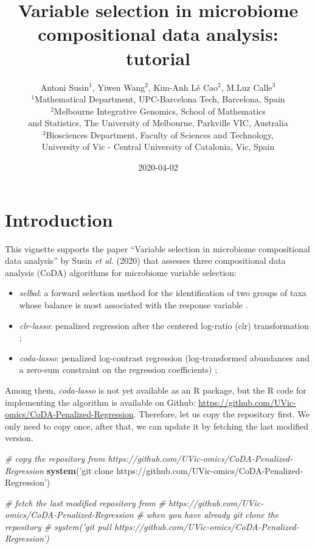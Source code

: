 \documentclass[openany]{book}
\title{Variable selection in microbiome compositional data analysis: tutorial}
\author{Antoni Susin\(^1\), Yiwen Wang\(^2\), Kim-Anh Lê Cao\(^2\), M.Luz
Calle\(^3\)\\[2\baselineskip]\(^1\)Mathematical Department,
UPC-Barcelona Tech, Barcelona, Spain\\
\(^2\)Melbourne Integrative Genomics, School of Mathematics\\
and Statistics, The University of Melbourne, Parkville VIC, Australia\\
\(^3\)Biosciences Department, Faculty of Sciences and Technology,\\
University of Vic - Central University of Catalonia, Vic, Spain}
\date{2020-04-02}
\newenvironment{Shaded}{\begin{snugshade}}{\end{snugshade}}
\newcommand{\KeywordTok}[1]{\textcolor[rgb]{0.13,0.29,0.53}{\textbf{#1}}}
\newcommand{\StringTok}[1]{\textcolor[rgb]{0.31,0.60,0.02}{#1}}
\newcommand{\CommentTok}[1]{\textcolor[rgb]{0.56,0.35,0.01}{\textit{#1}}}
\newcommand{\NormalTok}[1]{#1}
\providecommand{\tightlist}{%
  \setlength{\itemsep}{0pt}\setlength{\parskip}{0pt}}
\begin{document}
\maketitle

{
\hypersetup{linkcolor=black}
\setcounter{tocdepth}{3}
\tableofcontents
}
\chapter{Introduction}\label{introduction}

This vignette supports the paper ``Variable selection in microbiome
compositional data analysis'' by Susin \emph{et al.} (2020) that
assesses three compositional data analysis (CoDA) algorithms for
microbiome variable selection:

\begin{itemize}
\tightlist
\item
  \emph{selbal}: a forward selection method for the identification of
  two groups of taxa whose balance is most associated with the response
  variable \citep{rivera2018balances}.
\item
  \emph{clr-lasso}: penalized regression after the centered log-ratio
  (clr) transformation
  \citep{zou2005regularization, tibshirani1996regression, le1992ridge};
\item
  \emph{coda-lasso}: penalized log-contrast regression (log-transformed
  abundances and a zero-sum constraint on the regression coefficients)
  \citep{lu2019generalized, lin2014variable};
\end{itemize}

Among them, \emph{coda-lasso} is not yet available as an R package, but
the R code for implementing the algorithm is available on Github:
\url{https://github.com/UVic-omics/CoDA-Penalized-Regression}.
Therefore, let us copy the repository first. We only need to copy once,
after that, we can update it by fetching the last modified version.

\begin{Shaded}
\begin{Highlighting}[]
\CommentTok{# copy the repository from https://github.com/UVic-omics/CoDA-Penalized-Regression}
\KeywordTok{system}\NormalTok{(}\StringTok{'git clone https://github.com/UVic-omics/CoDA-Penalized-Regression'}\NormalTok{)}

\CommentTok{# fetch the last modified repository from }
\CommentTok{# https://github.com/UVic-omics/CoDA-Penalized-Regression}
\CommentTok{# when you have already git clone the repository}
\CommentTok{# system('git pull https://github.com/UVic-omics/CoDA-Penalized-Regression')}
\end{Highlighting}
\end{Shaded}
\end{document}
